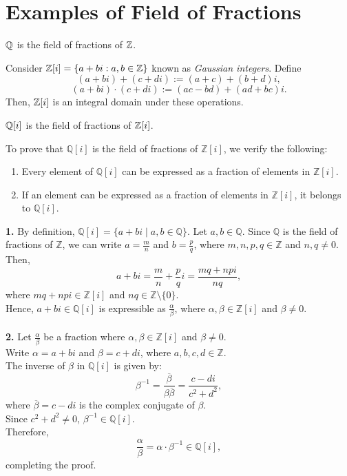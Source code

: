 \section{Examples of Field of Fractions}
\begin{eg}
    $\mathbb{Q}$ is the field of fractions of $\mathbb{Z}$.
\end{eg}
\begin{definition}
    Consider $\mathbb{Z}[i] = \{a + bi: a, b \in \mathbb{Z}\}$ known as \textit{Gaussian integers}. Define
    \[(a+bi) + (c + di) := (a+c)+(b+d)i,\]
    \[(a+bi) \cdot (c + di) := (ac-bd)+(ad + bc)i.\]
    Then, $\mathbb{Z}[i]$ is an integral domain under these operations.
\end{definition}
\begin{eg}
    $\mathbb{Q}[i]$ is the field of fractions of $\mathbb{Z}[i]$.
\end{eg}
\begin{explanation}
    To prove that \(\mathbb{Q}[i]\) is the field of fractions of \(\mathbb{Z}[i]\), we verify the following:
\begin{enumerate}
    \item Every element of \(\mathbb{Q}[i]\) can be expressed as a fraction of elements in \(\mathbb{Z}[i]\).
    \item If an element can be expressed as a fraction of elements in \(\mathbb{Z}[i]\), it belongs to \(\mathbb{Q}[i]\).
\end{enumerate}
\textbf{1.} By definition, \(\mathbb{Q}[i] = \{a + bi \mid a, b \in \mathbb{Q}\}\). 
    Let \(a, b \in \mathbb{Q}\). Since \(\mathbb{Q}\) is the field of fractions of \(\mathbb{Z}\), we can write \(a = \frac{m}{n}\) and \(b = \frac{p}{q}\), where \(m, n, p, q \in \mathbb{Z}\) and \(n, q \neq 0\).\\
    Then, 
    \[
    a + bi = \frac{m}{n} + \frac{p}{q}i = \frac{mq + np i}{nq},
    \]
    where \(mq + np i \in \mathbb{Z}[i]\) and \(nq \in \mathbb{Z} \setminus \{0\}\).\\
    Hence, \(a + bi \in \mathbb{Q}[i]\) is expressible as \(\frac{\alpha}{\beta}\), where \(\alpha, \beta \in \mathbb{Z}[i]\) and \(\beta \neq 0\).\\\\
\textbf{2.}
    Let \(\frac{\alpha}{\beta}\) be a fraction where \(\alpha, \beta \in \mathbb{Z}[i]\) and \(\beta \neq 0\).\\
    Write \(\alpha = a + bi\) and \(\beta = c + di\), where \(a, b, c, d \in \mathbb{Z}\).\\
    The inverse of \(\beta\) in \(\mathbb{Q}[i]\) is given by:
    \[
    \beta^{-1} = \frac{\overline{\beta}}{\beta \overline{\beta}} = \frac{c - di}{c^2 + d^2},
    \]
    where \(\overline{\beta} = c - di\) is the complex conjugate of \(\beta\).\\
    Since \(c^2 + d^2 \neq 0\), \(\beta^{-1} \in \mathbb{Q}[i]\).\\
    Therefore, 
    \[
    \frac{\alpha}{\beta} = \alpha \cdot \beta^{-1} \in \mathbb{Q}[i],
    \]
completing the proof.
\end{explanation}
